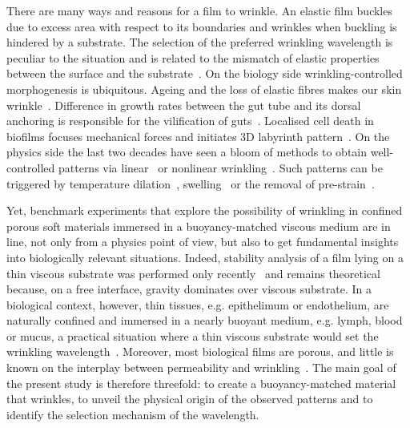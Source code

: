 \documentclass[twocolumn,superscriptaddress,showpacs,preprintnumbers,
amsmath,amssymb,prl]{revtex4-1}
\begin{document}
There are many ways and reasons for a film to wrinkle. An elastic film buckles due to excess area with respect to its boundaries and wrinkles when buckling is hindered by a substrate. The selection of the preferred wrinkling wavelength is peculiar to the situation and is related to the mismatch of elastic properties between the surface and the substrate~\cite{Gough1940, Bijlaard1946, Biot1957, Bowden1998, Cerda2003, Genzer2006}. On the biology side wrinkling-controlled morphogenesis is ubiquitous. Ageing and the loss of elastic fibres makes our skin wrinkle~\cite{Bissett1987, Genzer2006}. Difference in growth rates between the gut tube and its dorsal anchoring is responsible for the vilification of guts~\cite{Savin2011, Ciarletta2014, Shyer2013}. Localised cell death in biofilms focuses mechanical forces and initiates 3D labyrinth pattern~\cite{Trejo2013, Asally2012}. On the physics side the last two decades have seen a bloom of methods to obtain well-controlled patterns via linear~\cite{Bowden1998, Genzer2006, Hu1998, Kim2010, Vandeparre2011, Li2013} or nonlinear wrinkling~\cite{Efimenko2005, Guvendiren2010, Kim2011a, Brau2011}. Such patterns can be triggered by temperature dilation~\cite{Bowden1998}, swelling~\cite{Hu1998,Kim2010} or the removal of pre-strain~\cite{Genzer2006}. 



Yet, benchmark experiments that explore the possibility of wrinkling in confined porous soft materials immersed in a buoyancy-matched viscous medium are in line, not only from a physics point of view, but also to get fundamental insights into biologically relevant situations. Indeed, stability analysis of a film lying on a thin viscous substrate was performed only recently~\cite{Huang2002} and remains theoretical because, on a free interface, gravity dominates over viscous substrate. In a biological context, however, thin tissues, e.g. epithelimum or endothelium, are naturally confined and immersed in a nearly buoyant medium, e.g. lymph, blood or mucus, a practical situation where a thin viscous substrate would set the wrinkling wavelength~\cite{Fleury2015}. Moreover, most biological films are porous, and little is known on the interplay between permeability and wrinkling~\cite{Ma2004,Longley2013}. The main goal of the present study is therefore threefold: to create a buoyancy-matched material that wrinkles, to unveil the physical origin of the observed patterns and to identify the selection mechanism of the wavelength.
\end{document}
